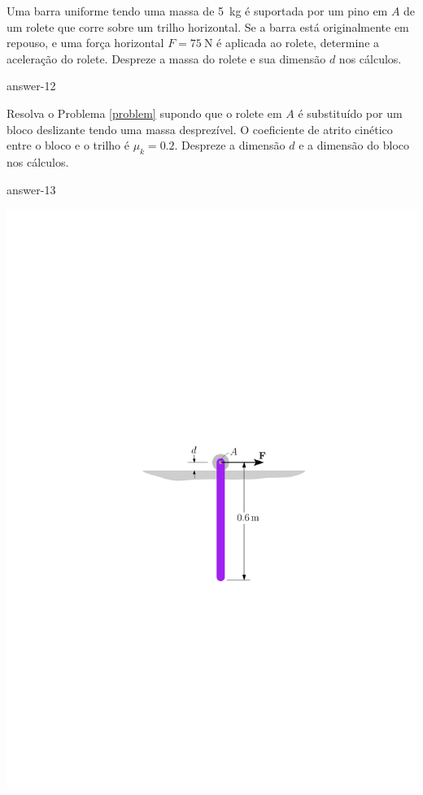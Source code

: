 \item\label{problem} Uma barra uniforme tendo uma massa de \SI{5}{\kilogram} é suportada por um pino em $A$ de um rolete que corre sobre um trilho horizontal. Se a barra está originalmente em repouso, e uma força horizontal $F=\SI{75}{\newton}$ é aplicada ao rolete, determine a aceleração do rolete. Despreze a massa do rolete
e sua dimensão $d$ nos cálculos.

{answer-12}

\begin{minipage}{.4\linewidth}
	\vspace{-1.3cm}
	\item Resolva o Problema \ref{problem} supondo que o rolete em $A$ é substituído por um bloco deslizante tendo uma massa desprezível. O coeficiente de atrito cinético entre o bloco e o trilho é $\mu_{k}=0.2$. Despreze a dimensão $d$ e a dimensão do bloco nos cálculos.
	
	{answer-13}
\end{minipage}
\begin{minipage}{.6\linewidth}
	\vspace{-.8cm}
	\begin{flushright}
		\includegraphics[scale=.9]{../../images/draw_11}
	\end{flushright}
\end{minipage}